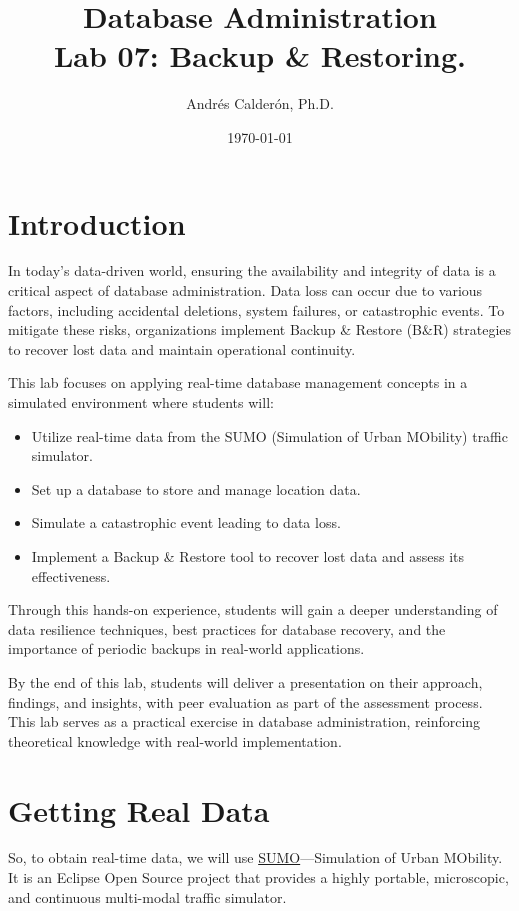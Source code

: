 \documentclass{article}
\title{Database Administration \\ Lab 07: Backup \& Restoring.}
\author{Andrés Calderón, Ph.D.}
\date{\today}
\begin{document}
\maketitle

\section{Introduction}

In today's data-driven world, ensuring the availability and integrity of data is a critical aspect of database administration. Data loss can occur due to various factors, including accidental deletions, system failures, or catastrophic events. To mitigate these risks, organizations implement Backup \& Restore (B\&R) strategies to recover lost data and maintain operational continuity.

This lab focuses on applying real-time database management concepts in a simulated environment where students will:
\begin{itemize}
    \item Utilize real-time data from the SUMO (Simulation of Urban MObility) traffic simulator.
    \item Set up a database to store and manage location data.
    \item Simulate a catastrophic event leading to data loss.
    \item Implement a Backup \& Restore tool to recover lost data and assess its effectiveness.
\end{itemize}

Through this hands-on experience, students will gain a deeper understanding of data resilience techniques, best practices for database recovery, and the importance of periodic backups in real-world applications.

By the end of this lab, students will deliver a presentation on their approach, findings, and insights, with peer evaluation as part of the assessment process.  This lab serves as a practical exercise in database administration, reinforcing theoretical knowledge with real-world implementation.

\section{Getting Real Data}
So, to obtain real-time data, we will use \href{https://eclipse.dev/sumo/}{SUMO}—Simulation of Urban MObility. It is an Eclipse Open Source project that provides a highly portable, microscopic, and continuous multi-modal traffic simulator.
\end{document}
